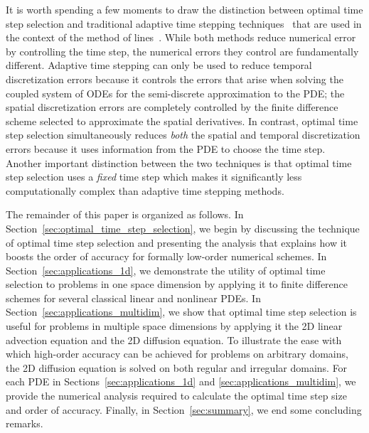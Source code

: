 \documentclass[fleqn,12pt,twoside]{article}
\begin{document}
It is worth spending a few moments to draw the distinction between optimal 
time step selection and traditional adaptive time stepping 
techniques~\cite{iserles_book,shampine_2005} that are used in the 
context of the method of lines~\cite{iserles_book,gko_book}.  
While both methods reduce numerical error by controlling the time step, the 
numerical errors they control are fundamentally different.  Adaptive time 
stepping can only be used to reduce temporal discretization errors because it 
controls the errors that arise when solving the coupled system of ODEs for the 
semi-discrete approximation to the PDE; the spatial discretization errors 
are completely controlled by the finite difference scheme selected to 
approximate the spatial derivatives.  
In contrast, optimal time step selection simultaneously reduces 
\emph{both} the spatial and temporal discretization errors because it
uses information from the PDE to choose the time step.  Another important 
distinction between the two techniques is that optimal time step selection 
uses a \emph{fixed} time step which makes it significantly less 
computationally complex than adaptive time stepping methods.

The remainder of this paper is organized as follows.  
In Section~\ref{sec:optimal_time_step_selection}, we begin by 
discussing the technique of optimal time step selection and 
presenting the analysis that explains how it boosts the order of accuracy 
for formally low-order numerical schemes.  In 
Section~\ref{sec:applications_1d}, we demonstrate the utility of 
optimal time selection to problems in one space dimension by applying it to 
finite difference schemes for several classical linear and nonlinear PDEs. 
In Section~\ref{sec:applications_multidim}, we show that optimal time step
selection is useful for problems in multiple space dimensions by applying it
the 2D linear advection equation and the 2D diffusion equation.  To illustrate 
the ease with which high-order accuracy can be achieved for problems on 
arbitrary domains, the 2D diffusion equation is solved on both regular 
and irregular domains.  
For each PDE in Sections~\ref{sec:applications_1d} and 
\ref{sec:applications_multidim}, we provide the numerical analysis required 
to calculate the optimal time step size and order of accuracy.  
Finally, in Section~\ref{sec:summary}, we end some concluding remarks. 
\end{document}
